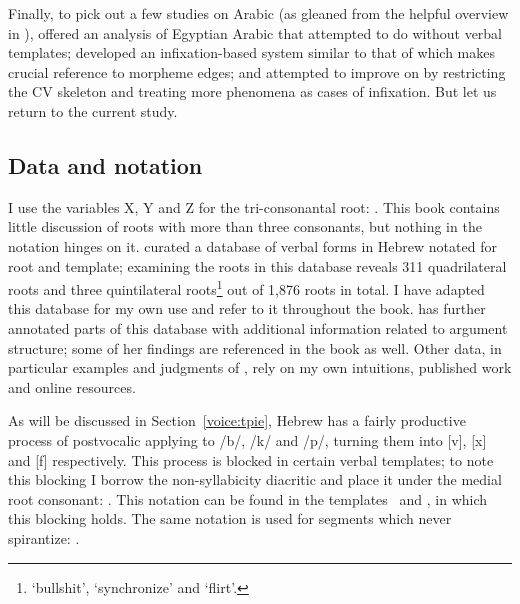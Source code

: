 \begin{exe}
\begin{xlist}
\begin{exe}
\begin{exe}
\begin{exe}
\begin{exe}
\begin{xlist}
\begin{exe}
\begin{xlist}
\begin{xlist}
\begin{xlist}
\begin{exe}
\begin{xlist}
Finally, to pick out a few studies on Arabic (as gleaned from the helpful overview in \citealt{ussishkin00phd}), \cite{darden92} offered an analysis of Egyptian Arabic that attempted to do without verbal templates; \cite{mcomber95} developed an infixation-based system similar to that of \cite{jjmcc81} which makes crucial reference to morpheme edges; and \cite{ratcliffe97,ratcliffe98} attempted to improve on \cite{jjmccprince90} by restricting the CV skeleton and treating more phenomena as cases of infixation. But let us return to the current study.

	\subsection{Data and notation} \label{sec:data:notation}
I use the variables X, Y and Z for the tri-consonantal root: . This book contains little discussion of roots with more than three consonants, but nothing in the notation hinges on it. \cite{ehrenfeld12} curated a database of verbal forms in Hebrew notated for root and template; examining the roots in this database reveals 311 quadrilateral roots and three quintilateral roots\footnote{ `bullshit',  `synchronize' and  `flirt'.} out of 1,876 roots in total. I have adapted this database for my own use and refer to it throughout the book. \cite{ahdout19phd} has further annotated parts of this database with additional information related to argument structure; some of her findings are referenced in the book as well. Other data, in particular examples and judgments of , rely on my own intuitions, published work and online resources.

As will be discussed in Section~\ref{voice:tpie}, Hebrew has a fairly productive process of postvocalic  applying to /b/, /k/ and /p/, turning them into [v], [x] and [f] respectively. This process is blocked in certain verbal templates; to note this blocking I borrow the non-syllabicity diacritic and place it under the medial root consonant: . This notation can be found in the templates \tpie~and \thit, in which this blocking holds. The same notation is used for segments which never spirantize: .


\end{xlist}
\end{exe}
\end{xlist}
\end{xlist}
\end{xlist}
\end{exe}
\end{xlist}
\end{exe}
\end{exe}
\end{exe}
\end{exe}
\end{xlist}
\end{exe}
